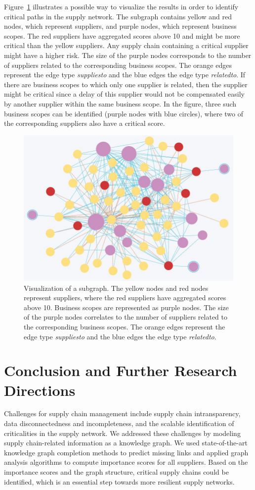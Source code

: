 \documentclass[
]{ceurart}
\begin{document}
Figure~\ref{fig:visualization} illustrates a possible way to visualize the results in order to identify critical paths in the supply network. The subgraph contains yellow and red nodes, which represent suppliers, and purple nodes, which represent business scopes. The red suppliers have aggregated scores above 10 and might be more critical than the yellow suppliers. Any supply chain containing a critical supplier might have a higher risk. The size of the purple nodes corresponds to the number of suppliers related to the corresponding business scopes. The orange edges represent the edge type \textit{supplies\textunderscore to} and the blue edges the edge type \textit{related\textunderscore to}. If there are business scopes to which only one supplier is related, then the supplier might be critical since a delay of this supplier would not be compensated easily by another supplier within the same business scope. In the figure, three such business scopes can be identified (purple nodes with blue circles), where two of the corresponding suppliers also have a critical score.
\begin{figure}
  \centering
  \includegraphics[width=0.77\linewidth]{figures/visualization.jpg}
  \caption{Visualization of a subgraph. The yellow nodes and red nodes represent suppliers, where the red suppliers have aggregated scores above 10. Business scopes are represented as purple nodes. The size of the purple nodes correlates to the number of suppliers related to the corresponding business scopes. The orange edges represent the edge type \textit{supplies\textunderscore to} and the blue edges the edge type \textit{related\textunderscore to}.}
  \label{fig:visualization}
\end{figure}

\section{Conclusion and Further Research Directions}
\label{sec:conclusion}
Challenges for supply chain management include supply chain intransparency, data disconnectedness and incompleteness, and the scalable identification of criticalities in the supply network. We addressed these challenges by modeling supply chain-related information as a knowledge graph. We used state-of-the-art knowledge graph completion methods to predict missing links and applied graph analysis algorithms to compute importance scores for all suppliers. Based on the importance scores and the graph structure, critical supply chains could be identified, which is an essential step towards more resilient supply networks.
\end{document}
